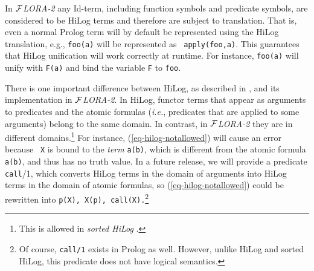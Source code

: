 \documentclass[11pt]{article}
\newcommand{\FLORA}{{\mbox{${\cal F}${\small\it LORA}\rm\emph{-2}}}\xspace}
\begin{document}
In \FLORA any Id-term, including function symbols and predicate symbols,
are considered to be HiLog terms and therefore are subject to translation.
That is, even a normal Prolog term will by default be represented using the
HiLog translation, e.g., {\tt foo(a)} will be represented as {\tt
  apply(foo,a)}. This guarantees that HiLog unification will work correctly
at runtime. For instance, {\tt foo(a)} will unify with {\tt F(a)} and bind
the variable {\tt F} to {\tt foo}.

There is one important difference between HiLog, as described in
\cite{hilog-jlp}, and its implementation in \FLORA. In HiLog, functor terms
that appear as arguments to predicates and the atomic formulas ({\it i.e.},
predicates that are applied to some arguments) belong to the same domain. 
In contrast, in \FLORA they are in different domains.\footnote{
  This is allowed in \emph{sorted HiLog} \cite{hilog-icdt-95}. 
  }
For instance, (\ref{eq-hilog-notallowed}) will cause an error because {\tt
  X} is bound to the \emph{term} {\tt a(b)}, which is different from the
atomic formula {\tt a(b)}, and thus has no truth value.  In a future
release, we will provide a predicate {\tt call}/1, which converts HiLog
terms in the domain of arguments into HiLog terms in the domain of atomic
formulas, so (\ref{eq-hilog-notallowed}) could be rewritten into {\tt p(X),
  X(p), call(X).}\footnote{
  Of course, {\tt call/1} exists in Prolog as well. However, unlike HiLog
  and sorted HiLog, this predicate does not have logical semantics.
  }
\end{document}
